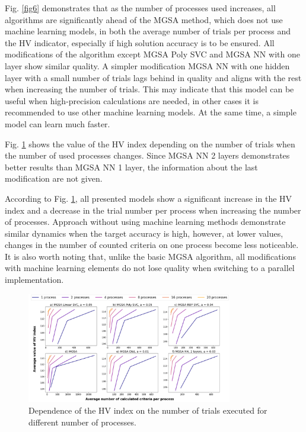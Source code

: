 \documentclass[runningheads]{llncs}
\begin{document}
Fig. \ref{fig6} demonstrates that as the number of processes used increases, all algorithms are significantly ahead of the MGSA method, which does not use machine learning models, in both the average number of trials per process and the HV indicator, especially if high solution accuracy is to be ensured. All modifications of the algorithm except MGSA Poly SVC and MGSA NN with one layer show similar quality. A simpler modification MGSA NN with one hidden layer with a small number of trials lags behind in quality and aligns with the rest when increasing the number of trials. This may indicate that this model can be useful when high-precision calculations are needed, in other cases it is recommended to use other machine learning models. At the same time, a simple model can learn much faster.

Fig. \ref{fig7} shows the value of the HV index depending on the number of trials when the number of used processes changes. Since MGSA NN 2 layers demonstrates better results than MGSA NN 1 layer, the information about the last modification are not given. 

According to Fig. \ref{fig7}, all presented models show a significant increase in the HV index and a decrease in the trial number per process when increasing the number of processes. Approach without using machine learning methods demonstrate similar dynamics when the target accuracy is high, however, at lower values, changes in the number of counted criteria on one process become less noticeable. It is also worth noting that, unlike the basic MGSA algorithm, all modifications with machine learning elements do not lose quality when switching to a parallel implementation.


\begin{figure}[t]
\center
\includegraphics[width=0.8\textwidth]{fig7.png}
\caption{Dependence of the HV index on the number of trials executed for different number of processes.} \label{fig7}
\end{figure}
\end{document}

